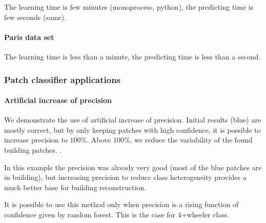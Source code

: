 				The learning time is few minutes (monoprocess, python), the predicting time is few seconds (same).
				
				
			\paragraph{Paris data set}
			
		 
				The learning time is less than a minute, the predicting time is less than a second. 
			
		\subsubsection{Patch classifier applications} 
			
			\paragraph{Artificial increase of precision}
				We demonstrate the use of artificial increase of precision. Initial results (blue) are mostly correct, but by only keeping patches with high confidence, it is possible to increase precision to $100$\%. Above $100$\%, we reduce the variability of the found building patches. 
				.
				
				In this example the precision was already very good (most of the blue patches are in building), but increasing precision to reduce class heterogeneity provides a much better base for building reconstruction.
				
				It is possible to use this method only when precision is  a rising function of confidence given by random forest.
				This is the case for 4+wheeler class.  
				

